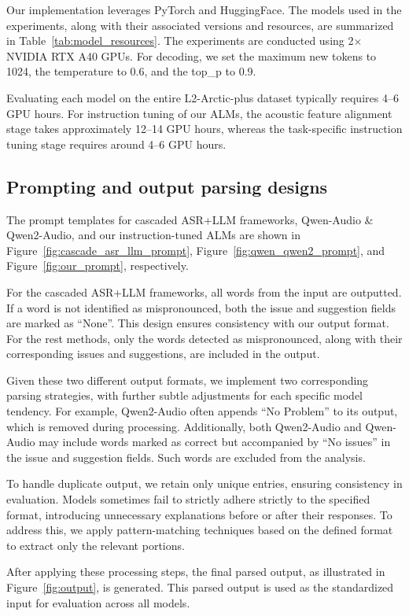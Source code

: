 \documentclass[11pt]{article}
\begin{document}
Our implementation leverages PyTorch and HuggingFace. The models used in the experiments, along with their associated versions and resources, are summarized in Table~\ref{tab:model_resources}. The experiments are conducted using 2× NVIDIA RTX A40 GPUs. For decoding, we set the maximum new tokens to 1024, the temperature to 0.6, and the top\_p to 0.9.

Evaluating each model on the entire L2-Arctic-plus dataset typically requires 4–6 GPU hours. For instruction tuning of our ALMs, the acoustic feature alignment stage takes approximately 12–14 GPU hours, whereas the task-specific instruction tuning stage requires around 4–6 GPU hours.




\subsection{Prompting and output parsing designs}
The prompt templates for cascaded ASR+LLM frameworks, Qwen-Audio \&  Qwen2-Audio, and our instruction-tuned ALMs are shown in Figure~\ref{fig:cascade_asr_llm_prompt}, Figure~\ref{fig:qwen_qwen2_prompt}, and Figure~\ref{fig:our_prompt}, respectively.

For the cascaded ASR+LLM frameworks, all words from the input are outputted. If a word is not identified as mispronounced, both the issue and suggestion fields are marked as ``None''. This design ensures consistency with our output format. For the rest methods, only the words detected as mispronounced, along with their corresponding issues and suggestions, are included in the output.

Given these two different output formats, we implement two corresponding parsing strategies, with further subtle adjustments for each specific model tendency. For example, Qwen2-Audio often appends ``No Problem'' to its output, which is removed during processing. Additionally, both Qwen2-Audio and Qwen-Audio may include words marked as correct but accompanied by ``No issues'' in the issue and suggestion fields. Such words are excluded from the analysis. 

To handle duplicate output, we retain only unique entries, ensuring consistency in evaluation. Models sometimes fail to strictly adhere strictly to the specified format, introducing unnecessary explanations before or after their responses. To address this, we apply pattern-matching techniques based on the defined format to extract only the relevant portions.

After applying these processing steps, the final parsed output, as illustrated in Figure~\ref{fig:output}, is generated. This parsed output is used as the standardized input for evaluation across all models.
\end{document}
